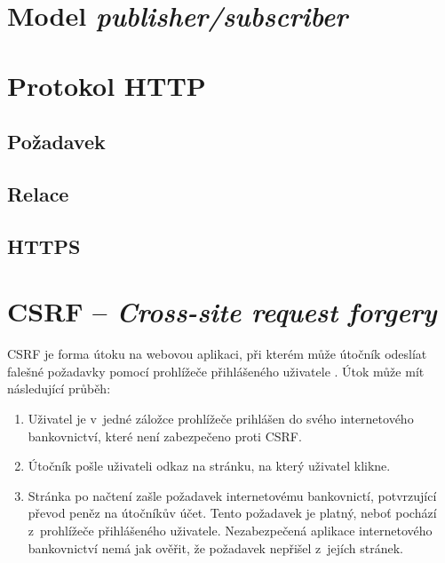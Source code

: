 \section{Model \textit{publisher/subscriber}}

\section{Protokol HTTP}

\subsection{Požadavek}

\subsection{Relace}

\subsection{HTTPS}




\section{CSRF -- \textit{Cross-site request forgery}}

CSRF je forma útoku na webovou aplikaci, při kterém může útočník odeslíat falešné požadavky pomocí prohlížeče přihlášeného uživatele \cite{csrf_owasp}. Útok může mít následující průběh:

\begin{enumerate}
    \item Uživatel je v~jedné záložce prohlížeče prihlášen do svého internetového bankovnictví, které není zabezpečeno proti CSRF.
    \item Útočník pošle uživateli odkaz na stránku, na který uživatel klikne.
    \item Stránka po načtení zašle požadavek internetovému bankovnictí, potvrzující převod peněz na útočníkův účet. Tento požadavek je platný, neboť pochází z~prohlížeče přihlášeného uživatele. Nezabezpečená aplikace internetového bankovnictví nemá jak ověřit, že požadavek nepřišel z~jejích stránek.
\end{enumerate}

